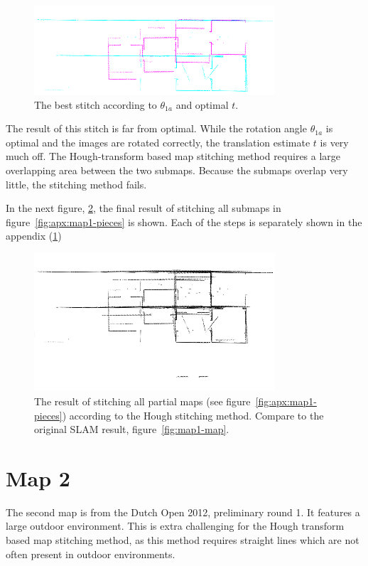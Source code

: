 \begin{figure}[ht]
  \centering
  \includegraphics[width=0.8\textwidth]{images/experiment/map1/stitch1-1a-result.png}
  \caption{The best stitch according to $\theta_{1a}$ and optimal $t$.}
  \label{fig:exp:1:result1}
\end{figure}

The result of this stitch is far from optimal. While the rotation angle $\theta_{1a}$ is optimal and the images are rotated correctly, the translation estimate $t$ is very much off. The Hough-transform based map stitching method requires a large overlapping area between the two submaps. Because the submaps overlap very little, the stitching method fails.

In the next figure, \ref{fig:exp:1:result8}, the final result of stitching all submaps in figure~\ref{fig:apx:map1-pieces} is shown. Each of the steps is separately shown in the appendix (\ref{})

\begin{figure}[ht]
  \centering
  \includegraphics[width=0.8\textwidth]{images/experiment/map1/result/step8.png}
  \caption{The result of stitching all partial maps (see figure~\ref{fig:apx:map1-pieces}) according to the Hough stitching method. Compare to the original SLAM result, figure~\ref{fig:map1-map}.}
  \label{fig:exp:1:result8}
\end{figure}

\section{Map 2}
The second map is from the Dutch Open 2012, preliminary round 1. It features a large outdoor environment. This is extra challenging for the Hough transform based map stitching method, as this method requires straight lines which are not often present in outdoor environments.

